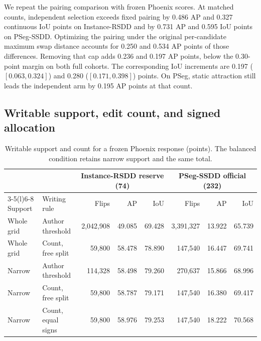 \documentclass[journal]{IEEEtran}
\begin{document}
We repeat the pairing comparison with frozen Phoenix scores. At matched counts, independent selection exceeds fixed pairing by 0.486 AP and 0.327 continuous IoU points on Instance-RSDD and by 0.731 AP and 0.595 IoU points on PSeg-SSDD. Optimizing the pairing under the original per-candidate maximum swap distance accounts for 0.250 and 0.534 AP points of those differences. Removing that cap adds 0.236 and 0.197 AP points, below the 0.30-point margin on both full cohorts. The corresponding IoU increments are 0.197 (\([0.063,0.324]\)) and 0.280 (\([0.171,0.398]\)) points. On PSeg, static attraction still leads the independent arm by 0.195 AP points at that count.

\subsection{Writable support, edit count, and signed allocation}

\begin{table}[t]
\centering
\caption{Writable support and count for a frozen Phoenix response (points). The balanced condition retains narrow support and the same total.}
\label{tab:phoenix-factors}
\footnotesize
\setlength{\tabcolsep}{5pt}
\begin{tabular}{@{}llrrr@{\quad}rrr@{}}
\toprule
 & & \multicolumn{3}{c}{Instance-RSDD reserve (74)} & \multicolumn{3}{c}{PSeg-SSDD official (232)}\\
\cmidrule(lr){3-5}\cmidrule(l){6-8}
Support & Writing rule & Flips & AP & IoU & Flips & AP & IoU\\
\midrule
Whole grid & Author threshold & 2,042,908 & 49.085 & 69.428 & 3,391,327 & 13.922 & 65.739\\
Whole grid & Count, free split & 59,800 & 58.478 & 78.890 & 147,540 & 16.447 & 69.741\\
Narrow & Author threshold & 114,328 & 58.498 & 79.260 & 270,637 & 15.866 & 68.996\\
Narrow & Count, free split & 59,800 & 58.787 & 79.171 & 147,540 & 16.380 & 69.417\\
Narrow & Count, equal signs & 59,800 & 58.976 & 79.253 & 147,540 & 18.222 & 70.568\\
\bottomrule
\end{tabular}
\end{table}
\end{document}
